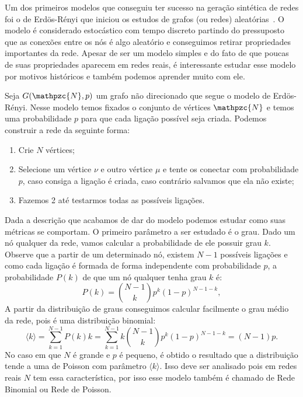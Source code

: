 Um dos primeiros modelos que conseguiu ter sucesso na geração sintética de redes foi o de Erdös-Rényi que iniciou os estudos de grafos (ou redes) aleatórias~\cite{Erdos:1959:pmd}. O modelo é considerado estocástico com tempo discreto partindo do pressuposto que as conexões entre os nós é algo aleatório e conseguimos retirar propriedades importantes da rede. 
Apesar de ser um modelo simples e do fato de que 
poucas de suas 
propriedades aparecem em redes reais, é interessante estudar esse modelo por motivos históricos e também podemos aprender muito com ele.

Seja $G(\mathpzc{N},p)$ um grafo não direcionado que segue o modelo de Erdös-Rényi. Nesse modelo temos fixados o conjunto de vértices $\mathpzc{N}$ e temos uma probabilidade $p$ para que cada ligação 
possível seja criada. Podemos construir a rede da seguinte forma:
\begin{enumerate}
  \item Crie $N$ vértices;
  \item Selecione um vértice $\nu$ e outro vértice $\mu$ e tente os conectar com probabilidade $p$, caso consiga a ligação é criada, caso contrário salvamos que ela não existe;
  \item Fazemos 2 até testarmos todas as possíveis ligações.
\end{enumerate}

Dada a descrição que acabamos de dar do modelo podemos estudar como suas métricas se comportam. O primeiro parâmetro a ser estudado é o grau. Dado um nó qualquer da rede,
vamos calcular a probabilidade de ele possuir grau $k$. Observe que a partir de um determinado nó, existem $N-1$ possíveis ligações e como cada ligação é formada de forma independente com probabilidade $p$,
a probabilidade $P(k)$ de que um nó qualquer tenha grau $k$ é:
\begin{equation}
  P(k) = \binom{N - 1}{k} p^k(1-p)^{N - 1 - k},
\end{equation}
A partir da distribuição de graus conseguimos calcular facilmente o grau médio da rede, pois é uma distribuição binomial:
\begin{equation}
  \langle k \rangle = \sum_{k = 1}^{N - 1}P(k)k = \sum_{k = 1}^{N - 1}k \binom{N - 1}{k}p^k(1-p)^{N - 1 - k} = (N - 1)p.
\end{equation}
No caso em que $N$ é grande e $p$ é pequeno, é obtido o resultado que a distribuição tende a uma de Poisson 
com parâmetro $\langle k \rangle$. 
Isso deve ser analisado pois em redes reais $N$ tem essa característica, por isso esse modelo também é chamado de Rede Binomial ou Rede de Poisson. 

